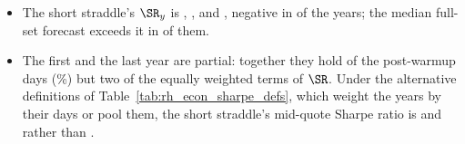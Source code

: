 \begin{itemize}
\begin{itemize}
    \rhemYearsFullMedAboveCiHarWord{} of the \rhemNYearsWord{} years, and it exceeds every full-set forecast in
    \rhemYearsCiHarAboveAllFullWord{} of them.
  \item The short straddle's $\SR_y$ is \rhemByYearShortOne, \rhemByYearShortTwo, \rhemByYearShortThree{} and
    \rhemByYearShortFour, negative in \rhemYearsShortNegWord{} of the \rhemNYearsWord{} years; the median full-set
    forecast exceeds it in \rhemYearsFullMedAboveShortWord{} of them.
  \item The first and the last year are partial: together they hold \rhemNPartialDays{} of the \rheSzDays{}
    post-warmup days (\rhemPartialDaysPct\%) but two of the \rhemNYearsWord{} equally weighted terms of $\SR$. Under
    the alternative definitions of Table~\ref{tab:rh_econ_sharpe_defs}, which weight the years by their days or pool
    them, the short straddle's mid-quote Sharpe ratio is \rhemShDOneShort{} and \rhemShDTwoShort{} rather than
    \rheShortSh.
  \end{itemize}
\end{itemize}

